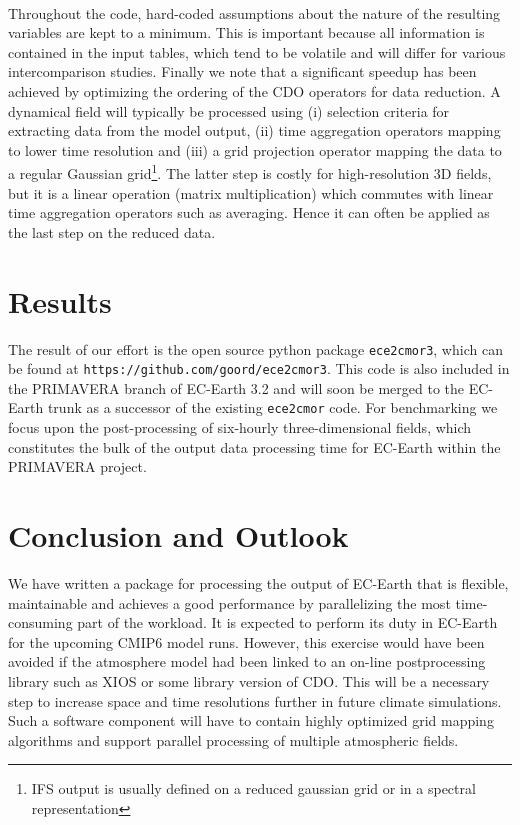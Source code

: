 \documentclass[procedia]{easychair}
\begin{document}
\\
Throughout the code, hard-coded assumptions about the nature of the resulting 
variables are kept to a minimum. This is important because all information is 
contained in the input tables, which tend to be volatile and will differ for 
various intercomparison studies. Finally we note that a significant speedup has 
been achieved by optimizing the ordering of the CDO operators for data 
reduction. A dynamical field will typically be processed using (i) selection 
criteria for extracting data from the model output, (ii) time aggregation 
operators mapping to lower time resolution and (iii) a grid projection operator 
mapping the data to a regular Gaussian grid\footnote{IFS output is usually 
defined on a reduced gaussian grid or in a spectral representation}. The latter 
step is costly for high-resolution 3D fields, but it is a linear operation 
(matrix multiplication) which commutes with linear time aggregation operators 
such as averaging. Hence it can often be applied as the last step on the 
reduced data.
\section{Results}
The result of our effort is the open source python package \texttt{ece2cmor3}, 
which can be found at \texttt{https://github.com/goord/ece2cmor3}. This code is 
also included in the PRIMAVERA branch of EC-Earth 3.2 and will soon be merged 
to the EC-Earth trunk as a successor of the existing \texttt{ece2cmor} code. 
For benchmarking we focus upon the post-processing of six-hourly 
three-dimensional fields, which constitutes the bulk of the output data 
processing time for EC-Earth within the PRIMAVERA project.
\section{Conclusion and Outlook}
We have written a package for processing the output of EC-Earth that is 
flexible, maintainable and achieves a good performance by parallelizing the 
most time-consuming part of the workload. It is expected to perform its duty in 
EC-Earth for the upcoming CMIP6 model runs. However, this exercise would have 
been avoided if the atmosphere model had been linked to an on-line 
postprocessing library such as XIOS or some library version of CDO. This will 
be a necessary step to increase space and time resolutions further in future 
climate simulations. Such a software component will have to contain highly 
optimized grid mapping algorithms and support parallel processing of multiple 
atmospheric fields.


%
\label{sect:bib}

%
%
%


\end{document}
